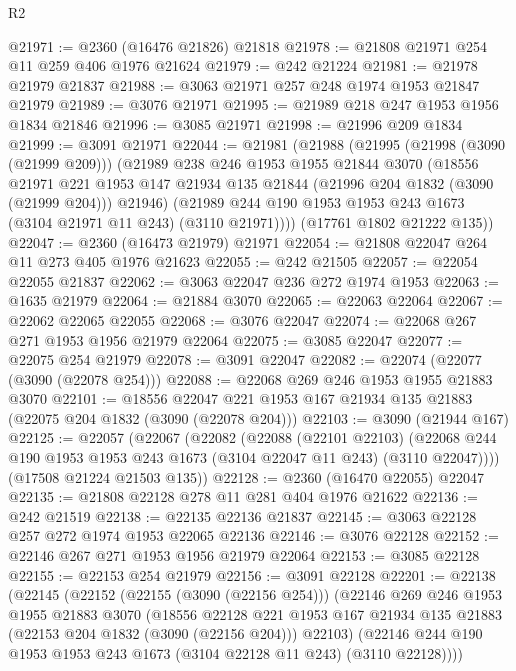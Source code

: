 \begin{lexlean}{R2}
\begin{coremodule}
@21971 := @2360 (@16476 @21826) @21818
@21978 := @21808 @21971 @254 @11 @259 @406 @1976 @21624
@21979 := @242 @21224
@21981 := @21978 @21979 @21837
@21988 := @3063 @21971 @257 @248 @1974 @1953 @21847 @21979
@21989 := @3076 @21971
@21995 := @21989 @218 @247 @1953 @1956 @1834 @21846
@21996 := @3085 @21971
@21998 := @21996 @209 @1834
@21999 := @3091 @21971
@22044 := @21981
    (@21988
      (@21995
        (@21998 (@3090 (@21999 @209)))
        (@21989
          @238
          @246
          @1953
          @1955
          @21844
          @3070
          (@18556
            @21971
            @221
            @1953
            @147
            @21934
            @135
            @21844
            (@21996 @204 @1832 (@3090 (@21999 @204)))
            @21946)
          (@21989 @244 @190 @1953 @1953 @243 @1673 (@3104 @21971 @11 @243) (@3110 @21971))))
      (@17761 @1802 @21222 @135))
@22047 := @2360 (@16473 @21979) @21971
@22054 := @21808 @22047 @264 @11 @273 @405 @1976 @21623
@22055 := @242 @21505
@22057 := @22054 @22055 @21837
@22062 := @3063 @22047 @236 @272 @1974 @1953
@22063 := @1635 @21979
@22064 := @21884 @3070
@22065 := @22063 @22064
@22067 := @22062 @22065 @22055
@22068 := @3076 @22047
@22074 := @22068 @267 @271 @1953 @1956 @21979 @22064
@22075 := @3085 @22047
@22077 := @22075 @254 @21979
@22078 := @3091 @22047
@22082 := @22074 (@22077 (@3090 (@22078 @254)))
@22088 := @22068 @269 @246 @1953 @1955 @21883 @3070
@22101 := @18556 @22047 @221 @1953 @167 @21934 @135 @21883 (@22075 @204 @1832 (@3090 (@22078 @204)))
@22103 := @3090 (@21944 @167)
@22125 := @22057
    (@22067
      (@22082
        (@22088
          (@22101 @22103)
          (@22068 @244 @190 @1953 @1953 @243 @1673 (@3104 @22047 @11 @243) (@3110 @22047))))
      (@17508 @21224 @21503 @135))
@22128 := @2360 (@16470 @22055) @22047
@22135 := @21808 @22128 @278 @11 @281 @404 @1976 @21622
@22136 := @242 @21519
@22138 := @22135 @22136 @21837
@22145 := @3063 @22128 @257 @272 @1974 @1953 @22065 @22136
@22146 := @3076 @22128
@22152 := @22146 @267 @271 @1953 @1956 @21979 @22064
@22153 := @3085 @22128
@22155 := @22153 @254 @21979
@22156 := @3091 @22128
@22201 := @22138
    (@22145
      (@22152
        (@22155 (@3090 (@22156 @254)))
        (@22146
          @269
          @246
          @1953
          @1955
          @21883
          @3070
          (@18556
            @22128
            @221
            @1953
            @167
            @21934
            @135
            @21883
            (@22153 @204 @1832 (@3090 (@22156 @204)))
            @22103)
          (@22146 @244 @190 @1953 @1953 @243 @1673 (@3104 @22128 @11 @243) (@3110 @22128))))

\end{coremodule}
\end{lexlean}
